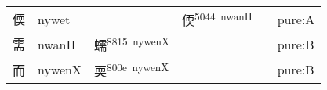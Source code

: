 \documentclass[14pt,a4paper]{scrartcl}
\begin{document}
\begin{longtable}[c]{@{}llllll@{}}
\begin{minipage}[t]{0.14\columnwidth}
偄
\strut\end{minipage} &
\begin{minipage}[t]{0.14\columnwidth}\raggedright\strut
nywet
\strut\end{minipage} &
\begin{minipage}[t]{0.14\columnwidth}\raggedright\strut
\strut\end{minipage} &
\begin{minipage}[t]{0.14\columnwidth}\raggedright\strut
偄\textsuperscript{5044~nwanH}
\strut\end{minipage} &
\begin{minipage}[t]{0.14\columnwidth}\raggedright\strut
\strut\end{minipage} &
\begin{minipage}[t]{0.14\columnwidth}\raggedright\strut
pure:A
\strut\end{minipage}\tabularnewline
\begin{minipage}[t]{0.14\columnwidth}\raggedright\strut
需
\strut\end{minipage} &
\begin{minipage}[t]{0.14\columnwidth}\raggedright\strut
nwanH
\strut\end{minipage} &
\begin{minipage}[t]{0.14\columnwidth}\raggedright\strut
蠕\textsuperscript{8815~nywenX}
\strut\end{minipage} &
\begin{minipage}[t]{0.14\columnwidth}\raggedright\strut
\strut\end{minipage} &
\begin{minipage}[t]{0.14\columnwidth}\raggedright\strut
\strut\end{minipage} &
\begin{minipage}[t]{0.14\columnwidth}\raggedright\strut
pure:B
\strut\end{minipage}\tabularnewline
\begin{minipage}[t]{0.14\columnwidth}\raggedright\strut
而
\strut\end{minipage} &
\begin{minipage}[t]{0.14\columnwidth}\raggedright\strut
nywenX
\strut\end{minipage} &
\begin{minipage}[t]{0.14\columnwidth}\raggedright\strut
耎\textsuperscript{800e~nywenX}
\strut\end{minipage} &
\begin{minipage}[t]{0.14\columnwidth}\raggedright\strut
\strut\end{minipage} &
\begin{minipage}[t]{0.14\columnwidth}\raggedright\strut
\strut\end{minipage} &
\begin{minipage}[t]{0.14\columnwidth}\raggedright\strut
pure:B
\strut\end{minipage}\tabularnewline
\bottomrule
\end{longtable}
\end{document}
